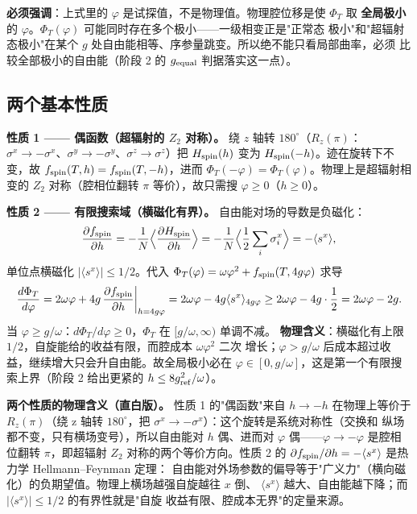 \documentclass[UTF8,11pt,a4paper]{ctexart}
\begin{document}
\textbf{必须强调}：上式里的 $\varphi$ 是试探值，不是物理值。物理腔位移是使 $\Phi_T$ 取
\textbf{全局极小}的 $\varphi$。$\Phi_T(\varphi)$ 可能同时存在多个极小——一级相变正是"正常态
极小"和"超辐射态极小"在某个 $g$ 处自由能相等、序参量跳变。所以绝不能只看局部曲率，必须
比较全部极小的自由能（阶段 2 的 $g_{\rm equal}$ 判据落实这一点）。

\subsection{两个基本性质}

\textbf{性质 1 —— 偶函数（超辐射的 $Z_2$ 对称）。} 绕 $z$ 轴转 $180^\circ$（$R_z(\pi)$：
$\sigma^x\to-\sigma^x$、$\sigma^y\to-\sigma^y$、$\sigma^z\to\sigma^z$）把 $H_{\rm spin}(h)$
变为 $H_{\rm spin}(-h)$。迹在旋转下不变，故 $f_{\rm spin}(T,h)=f_{\rm spin}(T,-h)$，进而
$\Phi_T(-\varphi)=\Phi_T(\varphi)$。物理上是超辐射相变的 $Z_2$ 对称（腔相位翻转 $\pi$
等价），故只需搜 $\varphi\ge0$（$h\ge0$）。

\textbf{性质 2 —— 有限搜索域（横磁化有界）。} 自由能对场的导数是负磁化：
\[
\frac{\partial f_{\rm spin}}{\partial h}=-\frac1N\Big\langle\frac{\partial H_{\rm spin}}
{\partial h}\Big\rangle=-\frac1N\Big\langle\frac12\sum_i\sigma_i^x\Big\rangle=-\langle s^x\rangle,
\]
单位点横磁化 $|\langle s^x\rangle|\le1/2$。代入 $\Phi_T(\varphi)=\omega\varphi^2+f_{\rm spin}(T,4g\varphi)$ 求导
\[
\frac{d\Phi_T}{d\varphi}=2\omega\varphi+4g\,\frac{\partial f_{\rm spin}}{\partial h}\bigg|_{h=4g\varphi}
=2\omega\varphi-4g\langle s^x\rangle_{4g\varphi}
\ge 2\omega\varphi-4g\cdot\frac12=2\omega\varphi-2g .
\]
当 $\varphi\ge g/\omega$：$d\Phi_T/d\varphi\ge0$，$\Phi_T$ 在 $[g/\omega,\infty)$ 单调不减。
\textbf{物理含义}：横磁化有上限 $1/2$，自旋能给的收益有限，而腔成本 $\omega\varphi^2$ 二次
增长；$\varphi>g/\omega$ 后成本超过收益，继续增大只会升自由能。故全局极小必在
$\varphi\in[0,g/\omega]$，这是第一个有限搜索上界（阶段 2 给出更紧的 $h\le8g_{\rm ref}^2/\omega$）。

\textbf{两个性质的物理含义（直白版）。} 性质 1 的"偶函数"来自 $h\to-h$ 在物理上等价于
$R_z(\pi)$（绕 z 轴转 $180^\circ$，把 $\sigma^x\to-\sigma^x$）：这个旋转是系统对称性（交换和
纵场都不变，只有横场变号），所以自由能对 $h$ 偶、进而对 $\varphi$ 偶——$\varphi\to-\varphi$
是腔相位翻转 $\pi$，即超辐射 $Z_2$ 对称的两个等价方向。性质 2 的
$\partial f_{\rm spin}/\partial h=-\langle s^x\rangle$ 是热力学 Hellmann--Feynman 定理：
自由能对外场参数的偏导等于"广义力"（横向磁化）的负期望值。物理上横场越强自旋越往 $x$ 倒、
$\langle s^x\rangle$ 越大、自由能越下降；而 $|\langle s^x\rangle|\le1/2$ 的有界性就是"自旋
收益有限、腔成本无界"的定量来源。
\end{document}
